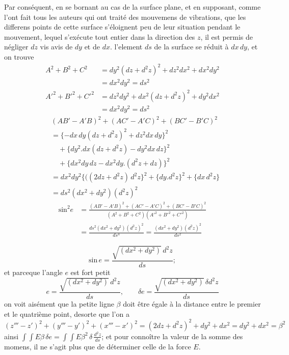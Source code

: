\documentclass[11pt,a4paper]{article}
\begin{document}
Par conséquent, en se bornant au cas de  la surface plane, et
en supposant, comme l'ont fait tous les auteurs qui ont
traité des mouvemens de vibrations, que les differens points de
cette surface s'éloignent peu de leur situation  pendant le mouvement,
lequel s'exécute tout entier dans la direction des $z$, il est
permis de négliger $dz$ vis avis de $dy$ et de $dx$. l'element
$ds$ de la surface se réduit à $dx\,dy$, et on trouve
\begin{align*}
A^2+B^2+C^2 &= dy^2(dz+d^2z)^2 + dz^2dx^2 + dx^2dy^2\\
&= dx^2dy^2 = ds^2\\
A'^2+B'^2+C'^2 &= dz^2dy^2 + dx^2(dz+d^2z)^2 + dy^2dx^2\\
&= dx^2dy^2 = ds^2
\end{align*}
\begin{align*}
&(AB'-A'B)^2+(AC'-A'C)^2+(BC'-B'C)^2\\
&= \{-dx\,dy(dz+d^2z)^2 + dz^2dx\,dy\}^2\\
&\quad + \{dy^2.dx(dz+d^2z) - dy^2dx\,dz\}^2\\
&\quad + \{dx^2dy\,dz - dx^2dy.(d^2z+dz)\}^2\\
&= dx^2dy^2\{((2dz+d^2z)\,d^2z\}^2 + \{dy.d^2z\}^2 + \{dx\,d^2z\}\\
&= ds^2(dx^2+dy^2)(d^2z)^2
\end{align*}
\begin{align*}
\text{sin}^2 e &= \frac{(AB'-A'B)^2+(AC'-A'C)^2+(BC'-B'C)^2}{(A^2+B^2+C^2)(A'^2+B'^2+C'^2)}\\
&= \frac{ds^2(dx^2+dy^2)(d^2z)^2}{ds^4} = \frac{(dx^2+dy^2)(d^2z)^2}{ds^2}
\end{align*}

\[ \text{sin}\,e = \frac{\sqrt{(dx^2+dy^2)}\,d^2z}{ds}; \]
et parceque l'angle $e$ est fort petit
\[ e = \frac{\sqrt{(dx^2+dy^2)}\,d^2z}{ds}, \qquad \delta e = \frac{\sqrt{(dx^2+dy^2)}\,\delta d^2z}{ds} \]
on voit aisément que la petite ligne $\beta$ doit être égale à la
distance entre le premier et le quatrième point, desorte que l'on a
\[ (z'''-z')^2+(y'''-y')^2+(x'''-x')^2 = (2dz+d^2z)^2+dy^2+dx^2 = dy^2+dx^2 = \beta^2 \]
ainsi $\int\!\!\int E\beta\,\delta e = \int\!\!\int E\beta^2\,\delta\,\frac{d^2z}{ds}$; et pour connoître la valeur
de la somme des momens, il ne s'agit plus que de déterminer
celle de la force $E$.
\end{document}
